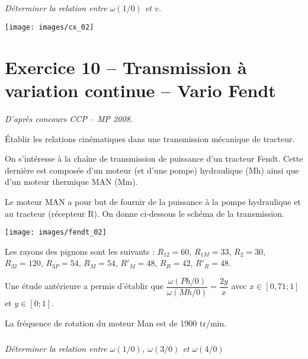 \documentclass[10pt,fleqn]{article} %
\begin{document}
\begin{multicols}{2}
\begin{multicols}{2}
\fi

\subparagraph{}
\textit{Déterminer la relation entre $\omega(1/0)$ et $v$.}

\ifprof
\begin{corrige}

\end{corrige}
\else
\fi


\ifprof
\else 
\begin{center}
\texttt{[image: images/cx\_02]}
\end{center}
\fi

\section*{Exercice 10 -- Transmission à variation continue -- Vario Fendt}
\setcounter{exo}{0}

\textit{D'après concours CCP -- MP 2008.}

\begin{obj} 
Établir les relations cinématiques dans une transmission mécanique de tracteur.
\end{obj}

\ifprof
\else

On s'intéresse à la chaîne de transmission de puissance d'un tracteur Fendt. Cette dernière est composée d'un moteur (et d'une pompe) hydraulique (Mh) ainsi que d'un moteur thermique MAN (Mm). 

Le moteur MAN a pour but de fournir de la puissance à la pompe hydraulique et au tracteur (récepteur R). On donne ci-dessous le schéma de la transmission. 
 
\begin{center}
\texttt{[image: images/fendt\_02]}
\end{center}

Les rayons des pignons sont les suivants : $R_{12}=60$, $R_{1M}=33$, $R_{2}=30$, $R_{32}=120$, $R_{3P}=54$, $R_{M}=54$, $R'_{M}=48$, $R_{R}=42$, $R'_{R}=48$. 

Une étude antérieure a permis d'établir que $\dfrac{\omega(Ph/0)}{\omega(Mh/0)} = \dfrac{2y}{x}$ avec $x\in[0,71;1]$ et $y\in[0;1]$.

La fréquence de rotation du moteur Man est de 1900 tr/min.
\fi

\subparagraph{}
\textit{Déterminer la relation entre $\omega(1/0)$, $\omega(3/0)$ et $\omega(4/0)$}


\end{multicols}
\end{multicols}
\end{document}
